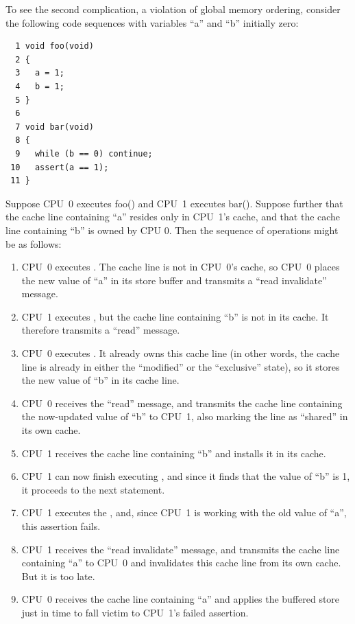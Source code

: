 To see the second complication, a violation of global memory ordering,
consider the following code sequences
with variables ``a'' and ``b'' initially zero:

\vspace{5pt}
\begin{minipage}[t]{\columnwidth}
\small
\begin{verbatim}
  1 void foo(void)
  2 {
  3   a = 1;
  4   b = 1;
  5 }
  6
  7 void bar(void)
  8 {
  9   while (b == 0) continue;
 10   assert(a == 1);
 11 }
\end{verbatim}
\end{minipage}
\vspace{5pt}

Suppose CPU~0 executes foo() and CPU~1 executes bar().
Suppose further that the cache line containing ``a'' resides only in CPU~1's
cache, and that the cache line containing ``b'' is owned by CPU 0.
Then the sequence of operations might be as follows:
\begin{enumerate}
\item	CPU~0 executes .  The cache line is not in
	CPU~0's cache, so CPU~0 places the new value of ``a'' in its
	store buffer and transmits a ``read invalidate'' message.
\item	CPU~1 executes , but the cache line
	containing ``b'' is not in its cache.
	It therefore transmits a ``read'' message.
\item	CPU~0 executes .
	It already owns this cache line (in other words, the cache line
	is already in either the ``modified'' or the ``exclusive'' state),
	so it stores the new value of ``b'' in its cache line.
\item	CPU~0 receives the ``read'' message, and transmits the
	cache line containing the now-updated value of ``b''
	to CPU~1, also marking the line as ``shared'' in its own cache.
\item	CPU~1 receives the cache line containing ``b'' and installs
	it in its cache.
\item	CPU~1 can now finish executing ,
	and since it finds that the value of ``b'' is 1, it proceeds
	to the next statement.
\item	CPU~1 executes the , and, since CPU~1 is
	working with the old value of ``a'', this assertion fails.
\item	CPU~1 receives the ``read invalidate'' message, and
	transmits the cache line containing ``a'' to CPU~0 and
	invalidates this cache line from its own cache.
	But it is too late.
\item	CPU~0 receives the cache line containing ``a'' and applies
	the buffered store just in time to fall victim to CPU~1's
	failed assertion.
\end{enumerate}

